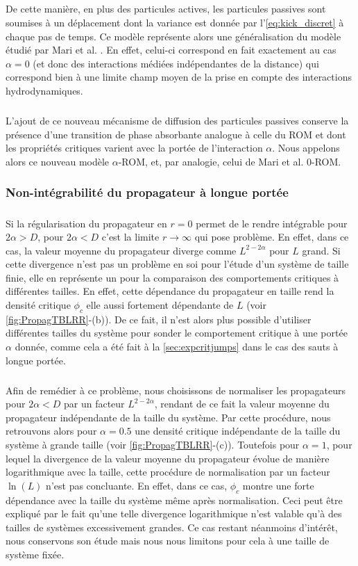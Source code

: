 \subparagraph{}De cette manière, en plus des particules actives, les particules passives sont soumises à un déplacement dont la variance est donnée par l'\autoref{eq:kick_discret} à chaque pas de temps. Ce modèle représente alors une généralisation du modèle étudié par Mari et al. \cite{mari_absorbing_2022}. En effet, celui-ci correspond en fait exactement au cas $\alpha = 0$ (et donc des interactions médiées indépendantes de la distance) qui correspond bien à une limite champ moyen de la prise en compte des interactions hydrodynamiques.

\subparagraph{}L'ajout de ce nouveau mécanisme de diffusion des particules passives conserve la présence d'une transition de phase absorbante analogue à celle du ROM et dont les propriétés critiques varient avec la portée de l'interaction $\alpha$. Nous appelons alors ce nouveau modèle $\alpha$-ROM, et, par analogie, celui de Mari et al. 0-ROM. 

\subsubsection{Non-intégrabilité du propagateur à longue portée}

\label{sec:noninteg}

\subparagraph{}Si la régularisation du propagateur en $r=0$ permet de le rendre intégrable pour $2\alpha > D$, pour $2\alpha<D$ c'est la limite $r\rightarrow\infty$ qui pose problème. En effet, dans ce cas, la valeur moyenne du propagateur diverge comme $L^{2-2\alpha}$ pour $L$ grand. Si cette divergence n'est pas un problème en soi pour l'étude d'un système de taille finie, elle en représente un pour la comparaison des comportements critiques à différentes tailles. En effet, cette dépendance du propagateur en taille rend la densité critique $\phi_c$ elle aussi fortement dépendante de $L$ (voir \autoref{fig:PropagTBLRR}-(b)). De ce fait, il n'est alors plus possible d'utiliser différentes tailles du système pour sonder le comportement critique à une portée $\alpha$ donnée, comme cela a été fait à la \autoref{sec:expcritjumps} dans le cas des sauts à longue portée.

\subparagraph{}Afin de remédier à ce problème, nous choisissons de normaliser les propagateurs pour $2\alpha<D$ par un facteur $L^{2-2\alpha}$, rendant de ce fait la valeur moyenne du propagateur indépendante de la taille du système. Par cette procédure, nous retrouvons alors pour $\alpha = 0.5$ une densité critique indépendante de la taille du système à grande taille (voir \autoref{fig:PropagTBLRR}-(c)). Toutefois pour $\alpha = 1$, pour lequel la divergence de la valeur moyenne du propagateur évolue de manière logarithmique avec la taille, cette procédure de normalisation par un facteur $\ln (L)$ n'est pas concluante. En effet, dans ce cas, $\phi_c$ montre une forte dépendance avec la taille du système même après normalisation. Ceci peut être expliqué par le fait qu'une telle divergence logarithmique n'est valable qu'à des tailles de systèmes excessivement grandes. Ce cas restant néanmoins d'intérêt, nous conservons son étude mais nous nous limitons pour cela à une taille de système fixée.

